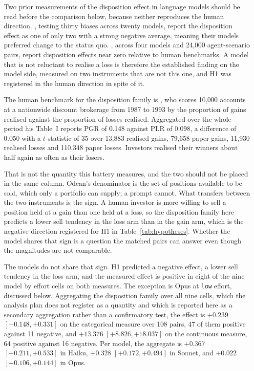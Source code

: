 \label{sec:humanbaselines}\label{app:humanbaselines}
Two prior measurements of the disposition effect in language models should be
read before the comparison below, because neither reproduces the human
direction. \citet{malberg2025comprehensive}, testing thirty biases across
twenty models, report the disposition effect as one of only two with a strong
negative average, meaning their models preferred change to the status quo.
\citet{yee2026calibrating}, across four models and 24{,}000
agent-scenario pairs, report disposition effects near zero relative to human
benchmarks. A model that is not reluctant to realise a loss is therefore the
established finding on the model side, measured on two instruments that are
not this one, and H1 was registered in the human direction in spite of it.

The human benchmark for the disposition family is
\citet{odean1998losses}, who scores 10,000 accounts at a nationwide discount
brokerage from 1987 to 1993 by the proportion of gains realised against the
proportion of losses realised. Aggregated over the whole period his Table~I
reports PGR of 0.148 against PLR of 0.098, a difference of 0.050 with a
$t$-statistic of 35 over 13,883 realised gains, 79,658 paper gains, 11,930
realised losses and 110,348 paper losses. Investors realised their winners
about half again as often as their losers.

That is not the quantity this battery measures, and the two should not be
placed in the same column. Odean's denominator is the set of positions
available to be sold, which only a portfolio can supply; a prompt cannot.
What transfers between the two instruments is the sign. A human investor is
more willing to sell a position held at a gain than one held at a loss, so
the disposition family here predicts a lower sell tendency in the loss arm
than in the gain arm, which is the negative direction registered for H1 in
Table~\ref{tab:hypotheses}. Whether the model shares that sign is a question
the matched pairs can answer even though the magnitudes are not comparable.

The models do not share that sign. H1 predicted a negative effect, a lower
sell tendency in the loss arm, and the measured effect is positive in eight
of the nine model by effort cells on both measures. The exception is Opus at
\texttt{low} effort, discussed below. Aggregating the disposition family over
all nine cells, which the analysis plan does not register as a quantity and
which is reported here as a secondary aggregation rather than a confirmatory
test, the effect is $+0.239$ $[+0.148, +0.331]$ on the categorical measure
over 108 pairs, 47 of them positive against 11 negative, and $+13.376$
$[+8.826, +18.037]$ on the continuous measure, 64 positive against 16
negative. Per model, the aggregate is $+0.367$ $[+0.211, +0.533]$ in Haiku,
$+0.328$ $[+0.172, +0.494]$ in Sonnet, and $+0.022$ $[-0.106, +0.144]$ in
Opus.

